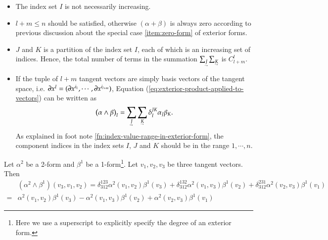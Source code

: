 \documentclass[11pt, a4paper]{book}
\begin{document}
\begin{Remark}
  \begin{itemize}
  \item The index set $I$ is not necessarily increasing.
  \item $l+m \leq n$ should be satisfied, otherwise $\left( \alpha+\beta \right)$ is
    always zero according to previous discussion about the special case
    \ref{item:zero-form} of exterior forms.
  \item $J$ and $K$ is a partition of the index set $I$, each of which is an increasing
    set of indices. Hence, the total number of terms in the summation
    $\sum_{\underaccent{\rightharpoondown}{J}}\sum_{\underaccent{\rightharpoondown}{K}}$
    is $C_{l+m}^l$.
  \item If the tuple of $l+m$ tangent vectors are simply basis vectors of the tangent
    space, i.e. $\boldsymbol{\partial}x^I =
    (\boldsymbol{\partial}x^{i_1},\cdots,\boldsymbol{\partial}x^{i_{l+m}})$, Equation
    (\ref{eq:exterior-product-applied-to-vectors}) can be written as
    \begin{equation}
      \label{eq:exterior-product-applied-to-basis-vectors}
      \left( \alpha\wedge\beta \right)_I =
      \sum_{\underaccent{\rightharpoondown}{J}}\sum_{\underaccent{\rightharpoondown}{K}}\delta_I^{JK}\alpha_J\beta_K.
    \end{equation}
    As explained in foot note \ref{fn:index-value-range-in-exterior-form}, the component
    indices in the index sets $I$, $J$ and $K$ should be in the range $1,\cdots,n$.
  \end{itemize}
\end{Remark}

\begin{Example}
  Let $\alpha^2$ be a 2-form and $\beta^1$ be a 1-form\footnote{Here we use a superscript
    to explicitly specify the degree of an exterior form.}. Let $v_1,v_2,v_3$ be three
  tangent vectors. Then
  \begin{equation}
    \begin{aligned}
      & \left( \alpha^2 \wedge \beta^1 \right)(v_3,v_1,v_2) =
      \delta_{312}^{123}\alpha^2(v_1,v_2)\beta^1(v_3) +
      \delta_{312}^{132}\alpha^2(v_1,v_3)\beta^1(v_2) +
      \delta_{312}^{231}\alpha^2(v_2,v_3)\beta^1(v_1) \\
      = & \alpha^2(v_1,v_2)\beta^1(v_3) - \alpha^2(v_1,v_3)\beta^1(v_2) +
      \alpha^2(v_2,v_3)\beta^1(v_1)
    \end{aligned}
  \end{equation}
\end{Example}
\end{document}
